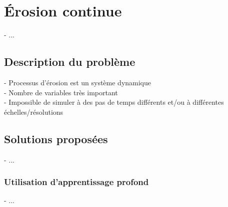 \chapter{Érosion continue}
\label{chap:continuous-erosion}
\minitoc

- ...

\section{Description du problème}
\label{sec:continuous-erosion_problematic}
- Processus d'érosion est un système dynamique \\
- Nombre de variables très important \\
- Impossible de simuler à des pas de temps différents et/ou à différentes échelles/résolutions

\section{Solutions proposées}
\label{sec:continuous-erosion_solutions}
- ...

\subsection{Utilisation d'apprentissage profond}
- ...
